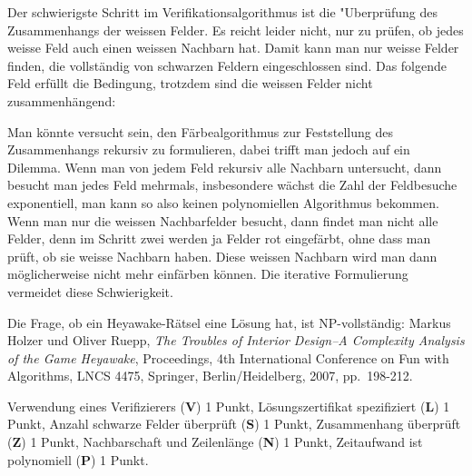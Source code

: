 \begin{diskussion}
Der schwierigste Schritt im Verifikationsalgorithmus ist die "Uberprüfung
des Zusammenhangs der weissen Felder.
Es reicht leider nicht, nur zu prüfen, ob jedes weisse Feld auch einen
weissen Nachbarn hat.
Damit kann man nur weisse Felder finden, die vollständig von schwarzen
Feldern eingeschlossen sind.
Das folgende Feld erfüllt die Bedingung, trotzdem sind die weissen
Felder nicht zusammenhängend:
\begin{center}
\def\h{1}
\end{center}

Man könnte versucht sein, den Färbealgorithmus zur Feststellung des
Zusammenhangs rekursiv zu formulieren, dabei trifft man jedoch auf ein
Dilemma.
Wenn man von jedem Feld rekursiv alle Nachbarn untersucht, dann besucht
man jedes Feld mehrmals, insbesondere wächst die Zahl der Feldbesuche
exponentiell, man kann so also keinen polynomiellen Algorithmus bekommen.
Wenn man nur die weissen Nachbarfelder besucht, dann findet man nicht
alle Felder, denn im Schritt zwei werden ja Felder rot eingefärbt, ohne 
dass man prüft, ob sie weisse Nachbarn haben.
Diese weissen Nachbarn wird man dann möglicherweise nicht mehr einfärben
können.
Die iterative Formulierung vermeidet diese Schwierigkeit.

Die Frage, ob ein Heyawake-Rätsel eine Lösung hat, ist NP-vollständig:
Markus Holzer und Oliver Ruepp, {\it The Troubles of Interior Design--A
Complexity Analysis of the Game Heyawake}, Proceedings,
4th International Conference on Fun with Algorithms, LNCS 4475, Springer,
Berlin/Heidelberg, 2007, pp.~198-212.
\end{diskussion}

\begin{bewertung}
Verwendung eines Verifizierers ({\bf V}) 1 Punkt,
Lösungszertifikat spezifiziert ({\bf L}) 1 Punkt,
Anzahl schwarze Felder überprüft ({\bf S}) 1 Punkt,
Zusammenhang überprüft ({\bf Z}) 1 Punkt,
Nachbarschaft und Zeilenlänge ({\bf N}) 1 Punkt,
Zeitaufwand ist polynomiell ({\bf P}) 1 Punkt.
\end{bewertung}
